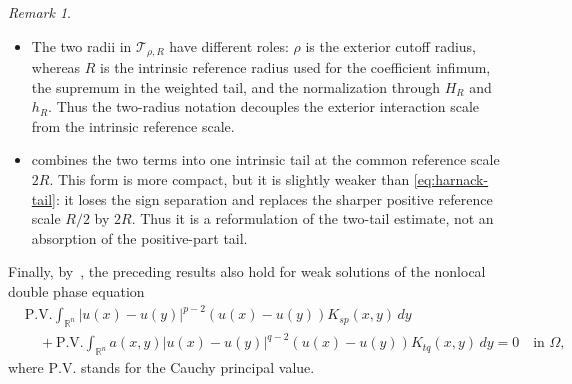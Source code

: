 \documentclass[reqno]{amsart}
\newcommand{\dd}{\,d}
\newcommand{\calT}{\mathcal T}
\theoremstyle{plain}
\theoremstyle{definition}
\theoremstyle{remark}
\newtheorem{remark}[theorem]{Remark}
\numberwithin{equation}{section}
\begin{document}
\begin{remark}

\begin{itemize}
\item[(i)] The two radii in \(\calT_{\rho,R}\) have different roles:
\(\rho\) is the exterior cutoff radius, whereas \(R\) is the intrinsic
reference radius used for the coefficient infimum, the supremum in the
weighted tail, and the normalization through \(H_R\) and \(h_R\). Thus
the two-radius notation decouples the exterior interaction scale from the
intrinsic reference scale.
\smallskip

\item[(ii)]  combines the two terms into one
intrinsic tail at the common reference scale \(2R\). This form is more
compact, but it is slightly weaker than \eqref{eq:harnack-tail}: it loses the
sign separation and replaces the sharper positive reference scale \(R/2\) by
\(2R\). Thus it is a reformulation of the two-tail estimate, not an absorption
of the positive-part tail.

\end{itemize}
\end{remark}

Finally, by~\cite[Section~3]{BOS22}, the preceding results also hold for weak
solutions of the nonlocal double phase equation
\begin{align*}
&\mathrm{P.V.}\int_{\mathbb{R}^n}|u(x)-u(y)|^{p-2}(u(x)-u(y))K_{sp}(x,y)\dd y \\
&\quad+\mathrm{P.V.}\int_{\mathbb{R}^n}a(x,y)
|u(x)-u(y)|^{q-2}(u(x)-u(y))K_{tq}(x,y)\dd y=0
\quad \text{in } \Omega,
\end{align*}
where $\mathrm{P.V.}$ stands for the Cauchy principal value.
\end{document}
